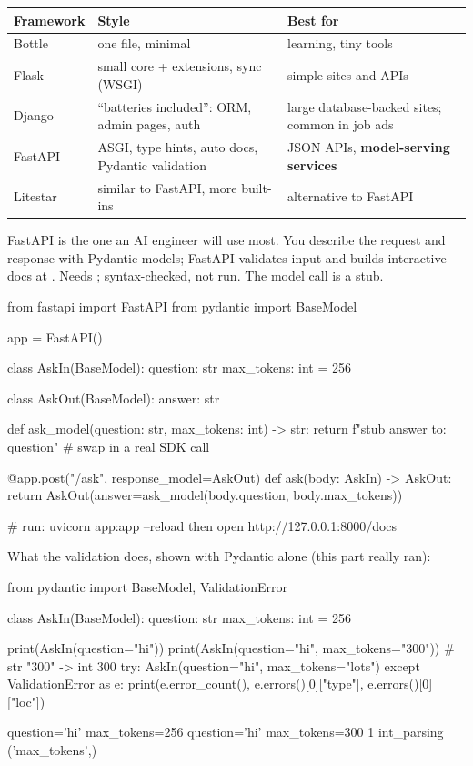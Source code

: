 \begin{center}
\begin{tabularx}{\linewidth}{@{}l X X@{}}
\toprule
\textbf{Framework} & \textbf{Style} & \textbf{Best for} \\
\midrule
Bottle & one file, minimal & learning, tiny tools \\
Flask & small core + extensions, sync (WSGI) & simple sites and APIs \\
Django & ``batteries included'': ORM, admin pages, auth & large database-backed sites; common in job ads \\
FastAPI & ASGI, type hints, auto docs, Pydantic validation & JSON APIs, \textbf{model-serving services} \\
Litestar & similar to FastAPI, more built-ins & alternative to FastAPI \\
\bottomrule
\end{tabularx}
\end{center}

FastAPI is the one an AI engineer will use most. You describe the request and response with
Pydantic models; FastAPI validates input and builds interactive docs at . Needs
; syntax-checked, not run. The model call is a stub.

\begin{pycode}
from fastapi import FastAPI
from pydantic import BaseModel

app = FastAPI()

class AskIn(BaseModel):
    question: str
    max_tokens: int = 256

class AskOut(BaseModel):
    answer: str

def ask_model(question: str, max_tokens: int) -> str:
    return f"stub answer to: {question}"     # swap in a real SDK call

@app.post("/ask", response_model=AskOut)
def ask(body: AskIn) -> AskOut:
    return AskOut(answer=ask_model(body.question, body.max_tokens))

# run:  uvicorn app:app --reload      then open http://127.0.0.1:8000/docs
\end{pycode}

What the validation does, shown with Pydantic alone (this part really ran):

\begin{pycode}
from pydantic import BaseModel, ValidationError

class AskIn(BaseModel):
    question: str
    max_tokens: int = 256

print(AskIn(question="hi"))
print(AskIn(question="hi", max_tokens="300"))     # str "300" -> int 300
try:
    AskIn(question="hi", max_tokens="lots")
except ValidationError as e:
    print(e.error_count(), e.errors()[0]["type"], e.errors()[0]["loc"])
\end{pycode}
\begin{rawcode}
question='hi' max_tokens=256
question='hi' max_tokens=300
1 int_parsing ('max_tokens',)
\end{rawcode}

